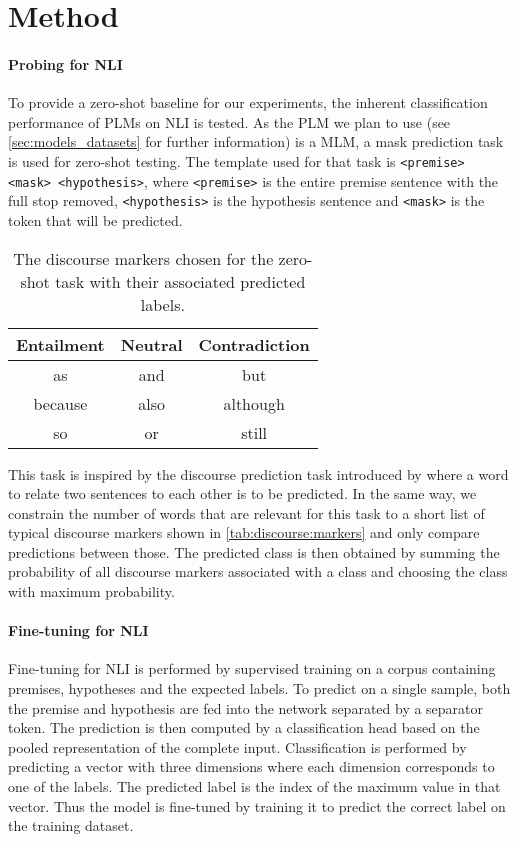 \documentclass[12pt,a4paper]{article}
\begin{document}
\section{Method}
\paragraph{Probing for \acs{NLI}}
To provide a zero-shot baseline for our experiments, the inherent classification performance of \acp{PLM} on \acs{NLI} is tested. As the \ac{PLM} we plan to use (see \autoref{sec:models_datasets} for further information) is a \ac{MLM}, a mask prediction task is used for zero-shot testing. The template used for that task is \texttt{<premise> <mask> <hypothesis>}, where \texttt{<premise>} is the entire premise sentence with the full stop removed, \texttt{<hypothesis>} is the hypothesis sentence and \texttt{<mask>} is the token that will be predicted.

\begin{table}[h]
    \centering
    \caption{The discourse markers chosen for the zero-shot task with their associated predicted labels.}
    \begin{tabular}{c | c | c}
        Entailment & Neutral & Contradiction \\
        \hline
        as & and  & but \\
        because & also & although \\
        so & or & still
    \end{tabular}
    \label{tab:discourse:markers}
\end{table}

This task is inspired by the discourse prediction task introduced by \cite{dissent} where a word to relate two sentences to each other is to be predicted. In the same way, we constrain the number of words that are relevant for this task to a short list of typical discourse markers shown in \autoref{tab:discourse:markers} and only compare predictions between those. The predicted class is then obtained by summing the probability of all discourse markers associated with a class and choosing the class with maximum probability.

\paragraph{Fine-tuning for \acs{NLI}}

Fine-tuning for \acs{NLI} is performed by supervised training on a corpus containing premises, hypotheses and the expected labels. To predict on a single sample, both the premise and hypothesis are fed into the network separated by a separator token. The prediction is then computed by a classification head based on the pooled representation of the complete input. Classification is performed by predicting a vector with three dimensions where each dimension corresponds to one of the labels. The predicted label is the index of the maximum value in that vector. Thus the model is fine-tuned by training it to predict the correct label on the training dataset.
\end{document}
